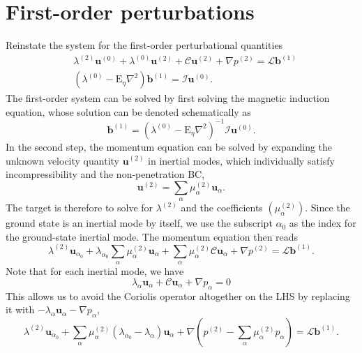 \section{First-order perturbations}

Reinstate the system for the first-order perturbational quantities
%
\begin{equation}
    \begin{aligned}
        &\lambda^{(2)} \mathbf{u}^{(0)} + \lambda^{(0)} \mathbf{u}^{(2)} + \mathcal{C} \mathbf{u}^{(2)} + \nabla p^{(2)} = \mathcal{L} \mathbf{b}^{(1)} \\
        &\left(\lambda^{(0)} - \mathrm{E}_\eta \nabla^2 \right) \mathbf{b}^{(1)} = \mathcal{I} \mathbf{u}^{(0)}.
    \end{aligned}
\end{equation}
%
The first-order system can be solved by first solving the magnetic induction equation, whose solution can be denoted schematically as
%
\begin{equation}
    \mathbf{b}^{(1)} = (\lambda^{(0)} - \mathrm{E}_\eta \nabla^2)^{-1} \mathcal{I} \mathbf{u}^{(0)}.
\end{equation}
%
In the second step, the momentum equation can be solved by expanding the unknown velocity quantity $\mathbf{u}^{(2)}$ in inertial modes, which individually satisfy incompressibility and the non-penetration BC,
%
\begin{equation}
    \mathbf{u}^{(2)} = \sum_\alpha \mu_\alpha^{(2)} \mathbf{u}_\alpha.
\end{equation}
%
The target is therefore to solve for $\lambda^{(2)}$ and the coefficients $(\mu_\alpha^{(2)})$. Since the ground state is an inertial mode by itself, we use the subscript $\alpha_0$ as the index for the ground-state inertial mode. The momentum equation then reads
%
\begin{equation}
    \lambda^{(2)} \mathbf{u}_{\alpha_0} + \lambda_{\alpha_0} \sum_\alpha \mu_\alpha^{(2)} \mathbf{u}_\alpha + \sum_\alpha \mu_\alpha^{(2)} \mathcal{C} \mathbf{u}_{\alpha} + \nabla p^{(2)} = \mathcal{L} \mathbf{b}^{(1)}.
\end{equation}
%
Note that for each inertial mode, we have
%
\begin{equation}
    \lambda_\alpha \mathbf{u}_\alpha + \mathcal{C} \mathbf{u}_\alpha + \nabla p_\alpha = 0
\end{equation}
%
This allows us to avoid the Coriolis operator altogether on the LHS by replacing it with $- \lambda_\alpha \mathbf{u}_\alpha - \nabla p_\alpha$,
%
\begin{equation}
    \lambda^{(2)} \mathbf{u}_{\alpha_0} + \sum_\alpha \mu_\alpha^{(2)} \left(\lambda_{\alpha_0} - \lambda_{\alpha}\right) \mathbf{u}_\alpha + \nabla \left(p^{(2)} - \sum_\alpha \mu_\alpha^{(2)} p_\alpha \right) = \mathcal{L} \mathbf{b}^{(1)}.
\end{equation}
